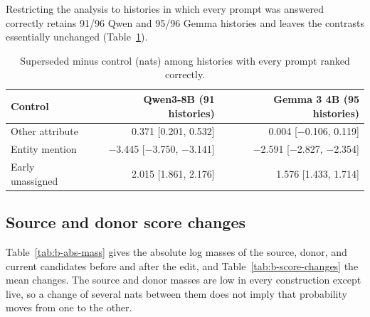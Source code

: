 Restricting the analysis to histories in which every prompt was answered correctly retains 91/96 Qwen and 95/96 Gemma histories and leaves the contrasts essentially unchanged (Table~\ref{tab:b-selected}).

\begin{table}[h]
\caption{Superseded minus control (nats) among histories with every prompt ranked correctly.}
\label{tab:b-selected}
\begin{center}
\small
\begin{tabular}{@{}lrr@{}}
\toprule
Control & Qwen3-8B (91 histories) & Gemma 3 4B (95 histories) \\
\midrule
Other attribute & 0.371 [0.201, 0.532] & 0.004 [−0.106, 0.119] \\
Entity mention & −3.445 [−3.750, −3.141] & −2.591 [−2.827, −2.354] \\
Early unassigned & 2.015 [1.861, 2.176] & 1.576 [1.433, 1.714] \\
\bottomrule
\end{tabular}
\end{center}
\end{table}

\subsection{Source and donor score changes}
\label{app:score-changes}

Table~\ref{tab:b-abs-mass} gives the absolute log masses of the source, donor, and current candidates before and after the edit, and Table~\ref{tab:b-score-changes} the mean changes. The source and donor masses are low in every construction except live, so a change of several nats between them does not imply that probability moves from one to the other.

